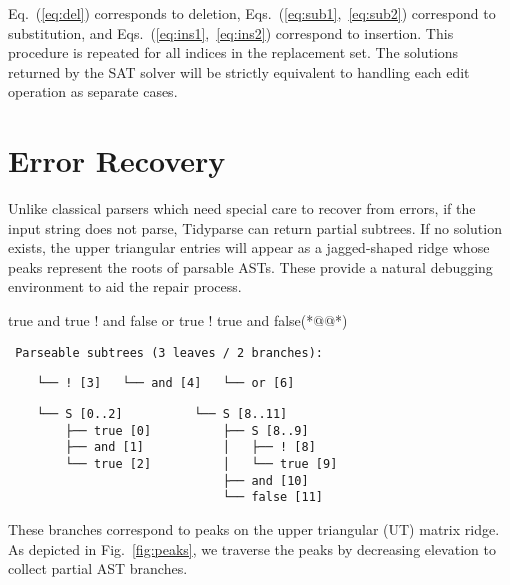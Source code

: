 \documentclass[sigplan,review,anonymous,acmsmall]{acmart}\settopmatter{printfolios=false,printccs=false,printacmref=false}
\begin{document}
    \noindent Eq.~(\ref{eq:del}) corresponds to deletion, Eqs.~(\ref{eq:sub1},~\ref{eq:sub2}) correspond to substitution, and Eqs.~(\ref{eq:ins1},~\ref{eq:ins2}) correspond to insertion. This procedure is repeated for all indices in the replacement set. The solutions returned by the SAT solver will be strictly equivalent to handling each edit operation as separate cases.

    \section{Error Recovery}\label{sec:error}

    Unlike classical parsers which need special care to recover from errors, if the input string does not parse, Tidyparse can return partial subtrees. If no solution exists, the upper triangular entries will appear as a jagged-shaped ridge whose peaks represent the roots of parsable ASTs. These provide a natural debugging environment to aid the repair process.

    \begin{tidyinput}
        true and true ! and false or true ! true and false(*@\caret{ }@*)
    \end{tidyinput}

    \begin{verbatim}
 Parseable subtrees (3 leaves / 2 branches):
    \end{verbatim}
    \noindent\hspace{0.64cm}\hspace{1.70cm}\hspace{1.98cm}\vspace{-5pt}
    \begin{verbatim}
    └── ! [3]   └── and [4]   └── or [6]
    \end{verbatim}
    \hspace{0.63cm}\hspace{3.4cm}\vspace{-5pt}
    \begin{verbatim}
    └── S [0..2]          └── S [8..11]
        ├── true [0]          ├── S [8..9]
        ├── and [1]           │   ├── ! [8]
        └── true [2]          │   └── true [9]
                              ├── and [10]
                              └── false [11]
    \end{verbatim}

    \noindent These branches correspond to peaks on the upper triangular (UT) matrix ridge. As depicted in Fig.~\ref{fig:peaks}, we traverse the peaks by decreasing elevation to collect partial AST branches.
\end{document}
